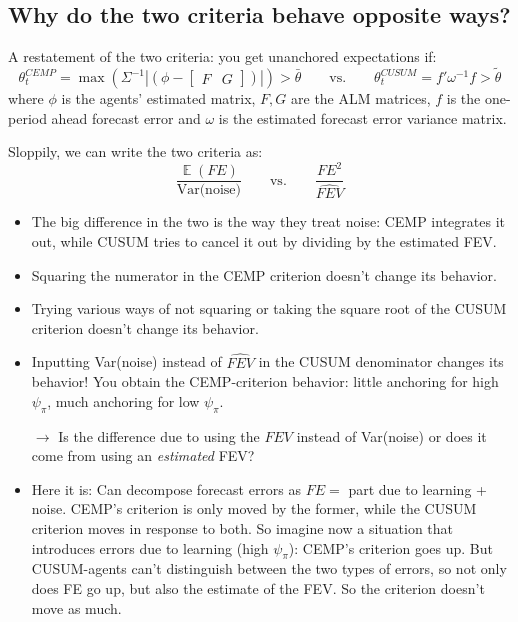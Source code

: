 \documentclass[11pt]{article}
\renewcommand{\[}{\begin{equation}}
\renewcommand{\]}{\end{equation}}
\DeclareMathOperator{\E}{\mathbb{E}}
\begin{document}
\subsection{Why do the two criteria behave opposite ways?}

A restatement of the two criteria: you get unanchored expectations if:
\begin{equation}
\theta_t^{CEMP} = \max(\Sigma^{-1}| ( \phi - \begin{bmatrix} F & G \end{bmatrix}) |) > \bar{\theta} \quad \quad \text{vs.} \quad \quad  \theta_t^{CUSUM} = f' \omega^{-1}f > \tilde{\theta}
\end{equation}
where $\phi$ is the agents' estimated matrix, $F,G$ are the ALM matrices, $f$ is the one-period ahead forecast error and $\omega$ is the estimated forecast error variance matrix. 

Sloppily, we can write the two criteria as:
\begin{equation}
\frac{\E(FE)}{\text{Var(noise)}} \quad \quad \text{vs.} \quad \quad \frac{FE^2}{\hat{FEV}}
\end{equation}

\begin{itemize}
\item The big difference in the two is the way they treat noise: CEMP integrates it out, while CUSUM tries to cancel it out by dividing by the estimated FEV.
\item Squaring the numerator in the CEMP criterion doesn't change its behavior. 
\item Trying various ways of not squaring or taking the square root of the CUSUM criterion doesn't change its behavior.
\item Inputting Var(noise) instead of $\hat{FEV}$ in the CUSUM denominator changes its behavior! You obtain the CEMP-criterion behavior: little anchoring for high $\psi_{\pi}$, much anchoring for low $\psi_{\pi}$.
\item[$\rightarrow$] Is the difference due to using the $FEV$ instead of Var(noise) or does it come from using an \emph{estimated} FEV?
\item Here it is: Can decompose forecast errors as $FE = $ part due to learning + noise. CEMP's criterion is only moved by the former, while the CUSUM criterion moves in response to both. So imagine now a situation that introduces errors due to learning (high $\psi_{\pi}$): CEMP's criterion goes up. But CUSUM-agents can't distinguish between the two types of errors, so not only does FE go up, but also the estimate of the FEV. So the criterion doesn't move as much. 
\end{itemize}
\end{document}

